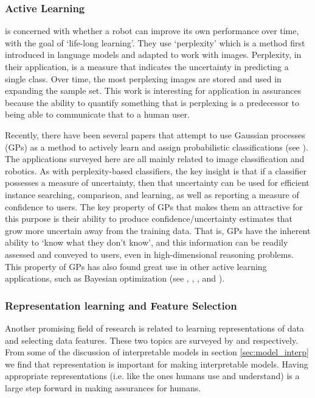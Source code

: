 \subsubsection{Active Learning}
    \citet{Paul2011-vr} is concerned with whether a robot can improve its own performance over time, with the goal of `life-long learning'. They use `perplexity' which is a method first introduced in language models and adapted to work with images. Perplexity, in their application, is a measure that indicates the uncertainty in predicting a single class. Over time, the most perplexing images are stored and used in expanding the sample set. This work is interesting for application in assurances because the ability to quantify something that is perplexing is a predecessor to being able to communicate that to a human user.

    Recently, there have been several papers that attempt to use Gaussian processes (GPs) as a method to actively learn and assign probabilistic classifications (see \citet{MacKay1992-sp,Triebel2016-kj,Triebel2013-ow,Triebel2013-ku,Grimmett2013-gj,Grimmett2016-yc,Berczi2015-rd,Dequaire2016-kh}). The applications surveyed here are all mainly related to image classification and robotics. As with perplexity-based classifiers, the key insight is that if a classifier possesses a measure of uncertainty, then that uncertainty can be used for efficient instance searching, comparison, and learning, as well as reporting a measure of confidence to users. The key property of GPs that makes them an attractive for this purpose is their ability to produce confidence/uncertainty estimates that grow more uncertain away from the training data. That is, GPs have the inherent ability to `know what they don't know', and this information can be readily assessed and conveyed to users, even in high-dimensional reasoning problems. This property of GPs has also found great use in other active learning applications, such as  Bayesian optimization (see \citet{Williams1998-kr}, \citet{Snoek2012-tt}, \citet{Brochu2010-tj}, and \citet{Israelsen2017-zb}).

\subsubsection{Representation learning and Feature Selection}
    Another promising field of research is related to learning representations of data and selecting data features. These two topics are surveyed by \citet{Bengio2013-uv} and \citet{Guyon2003-fj} respectively. From some of the discussion of interpretable models in section \ref{sec:model_interp} we find that representation is important for making interpretable models. Having appropriate representations (i.e. like the ones humans use and understand) is a large step forward in making assurances for humans.

